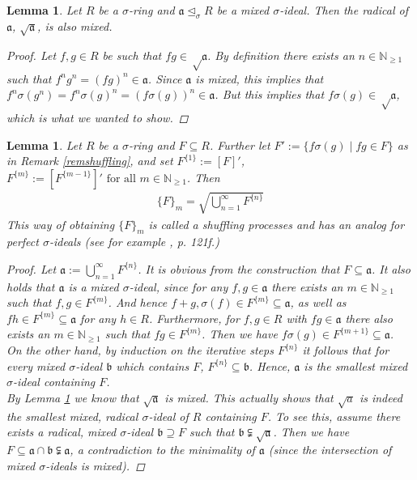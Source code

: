 \documentclass{article}
\def\NE{\mathbb{N}_{\geq1}}
\def\a{\mathfrak{a}}
\def\b{\mathfrak{b}}
\def\s{\sigma}
\def\si{\unlhd_{\sigma}}
\def\fa{\text{ for all }}
\newenvironment{bew}{\begin{proof}[Proof]}{\end{proof}}
\theoremstyle{plain}
\newtheorem{lem}[Satz]{Lemma}
\theoremstyle{definition}
\begin{document}
\begin{lem}\label{sqrtmixed}
Let $R$ be a $\s$-ring and $\a \si R$ be a mixed $\s$-ideal. Then the radical of $\a$, $\sqrt{\a}$, is also mixed.
\begin{bew}
Let $f,g \in R$ be such that $fg \in \sqrt \a$. By definition there exists an $n \in \NE$ such that $f^n g^n = (fg)^n \in \a$. Since $\a$ is mixed, this implies that $f^n \s(g^n) = f^n \s(g)^n = (f\s(g))^n \in \a$. 
But this implies that $f\s(g) \in \sqrt \a$, which is what we wanted to show.
\end{bew}
\end{lem}

\begin{lem}\label{lemsuffling}
Let $R$ be a $\s$-ring and $F \subseteq R$. Further let $F' := \{f\s(g) \mid fg \in F \}$ as in Remark \ref{remshuffling}, and set $F^{\{1\}}:= [F]'$, $F^{\{m\}}:= [F^{\{m-1\}}]' \fa m \in \NE$. Then
\begin{align} \{F\}_m = \sqrt{\bigcup_{n=1}^{\infty} F^{\{n\}}} \end{align}
This way of obtaining $\{F\}_m$ is called a shuffling processes and has an analog for perfect $\s$-ideals (see for example \cite{levin}, p. 121f.) 
\begin{proof}
Let $\a:= \bigcup_{n=1}^{\infty} F^{\{n\}}$. It is obvious from the construction that $F \subseteq \a$. It also holds that $\a$ is a mixed $\s$-ideal, since for any $f,g \in \a$ there exists an $m \in \NE$ such that $f,g \in F^{\{m\}}$.
And hence $f + g, \s(f) \in F^{\{m\}} \subseteq \a$, as well as $fh \in F^{\{m\}} \subseteq \a$ for any $h \in R$. Furthermore, for $f, g \in R$ with $fg \in \a$ there also exists an $m \in \NE$ such that $fg \in F^{\{m\}}$. 
Then we have $f\s(g) \in F^{\{m+1\}} \subseteq \a$. \\
On the other hand, by induction on the iterative steps $F^{\{n\}}$ it follows that for every mixed $\s$-ideal $\b$ which contains $F$, $F^{\{n\}} \subseteq \b$. Hence, $\a$ is the smallest mixed $\s$-ideal containing $F$. \\
By Lemma \ref{sqrtmixed} we know that $\sqrt{\a}$ is mixed. This actually shows that $\sqrt a$ is indeed the smallest mixed, radical $\s$-ideal of $R$ containing $F$. To see this, assume there exists a radical, mixed $\s$-ideal $\b \supseteq F$
such that $\b \subsetneqq \sqrt{\a}$. Then we have $F \subseteq \a \cap \b \subsetneqq \a$, a contradiction to the minimality of $\a$ (since the intersection of mixed $\s$-ideals is mixed). 
\end{proof}
\end{lem}
\end{document}

